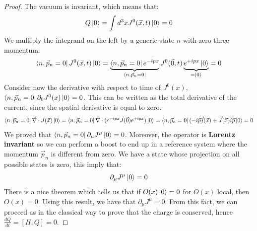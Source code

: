 \documentclass[../main.tex]{subfiles}
\begin{document}
\begin{proof}
The vacuum is invariant, which means that:
\[
Q\ket{0}=\int d^3xJ^0(\Vec{x},t)\ket{0}=0
\]
We multiply the integrand on the left by a generic state $n$ with zero three momentum:
\[
\bra{n,\vec{p}_n=0}J^0(\Vec{x},t)\ket{0}=\underbrace{\bra{n,\vec{p}_n=0}e^{-ipx}}_{\bra{n,\Vec{p}_n=0}}J^0(\Vec{0},t)\underbrace{e^{+ipx}\ket{0}}_{=\ket{0}}=0
\]
Consider now the derivative with respect to time of $J^0(x)$,\\
$\bra{n,\vec{p}_n=0}\partial_0J^0(x)\ket{0}=0$. This can be written as the total derivative of the current, since the spatial derivative is equal to zero.
\[
\bra{n,\vec{p}_n=0}\Vec{\nabla}\cdot\Vec{J}(\Vec{x})\ket{0}=\bra{n,\vec{p}_n=0}\Vec{\nabla}\cdot(e^{-ipx}\Vec{J}(\Vec{0})e^{+ipx})\ket{0}=\bra{n,\vec{p}_n=0}(-i\Vec{p}\Vec{j}(\Vec{x})+\Vec{J}(\Vec{x})i\Vec{p}\ket{0}=0
\]
We proved that $\bra{n,\vec{p}_n=0}\partial_\mu J^\mu\ket{0}=0$. Moreover, the operator is \textbf{Lorentz invariant} so we can perform a boost to end up in a reference system where the momentum $\vec{p}_n$ is different from zero. We have a state whose projection on all possible states is zero, this imply that:
\[
\partial_\mu J^\mu\ket{0}=0
\]
There is a nice theorem which tells us that if $O(x)\ket{0}=0$ for $O(x)$ local, then $O(x)=0$. Using this result, we have that $\partial_\mu J^\mu=0$. From this fact, we can proceed as in the classical way to prove that the charge is conserved, hence $\frac{dQ}{dt}=[H,Q]=0$.
\end{proof}
\end{document}
